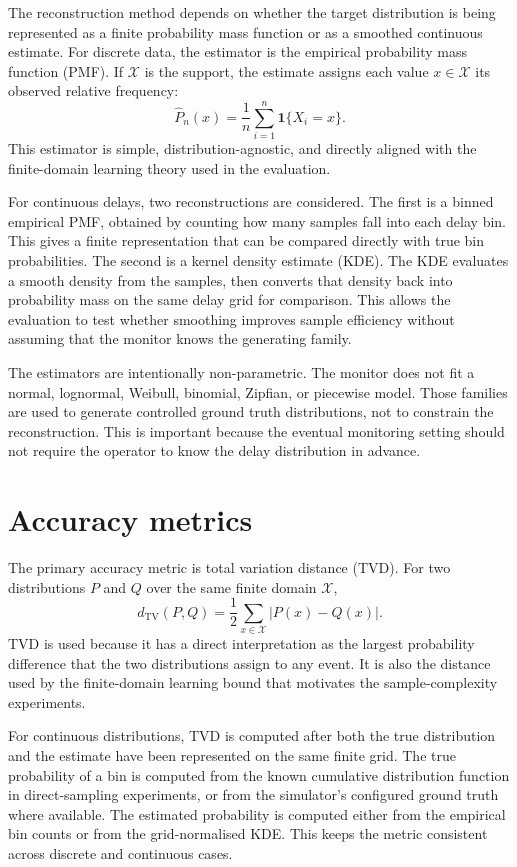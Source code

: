\documentclass[a4paper,11pt]{report}
\begin{document}
The reconstruction method depends on whether the target distribution is being represented as a finite probability mass function or as a smoothed continuous estimate. For discrete data, the estimator is the empirical probability mass function (PMF). If \(\mathcal{X}\) is the support, the estimate assigns each value \(x \in \mathcal{X}\) its observed relative frequency:
\[
\widehat{P}_n(x)=\frac{1}{n}\sum_{i=1}^{n}\mathbf{1}\{X_i=x\}.
\]
This estimator is simple, distribution-agnostic, and directly aligned with the finite-domain learning theory used in the evaluation.

For continuous delays, two reconstructions are considered. The first is a binned empirical PMF, obtained by counting how many samples fall into each delay bin. This gives a finite representation that can be compared directly with true bin probabilities. The second is a kernel density estimate (KDE). The KDE evaluates a smooth density from the samples, then converts that density back into probability mass on the same delay grid for comparison. This allows the evaluation to test whether smoothing improves sample efficiency without assuming that the monitor knows the generating family.

The estimators are intentionally non-parametric. The monitor does not fit a normal, lognormal, Weibull, binomial, Zipfian, or piecewise model. Those families are used to generate controlled ground truth distributions, not to constrain the reconstruction. This is important because the eventual monitoring setting should not require the operator to know the delay distribution in advance.

\section{Accuracy metrics}
\label{sec:method-accuracy-metrics}

The primary accuracy metric is total variation distance (TVD). For two distributions \(P\) and \(Q\) over the same finite domain \(\mathcal{X}\),
\[
d_{\mathrm{TV}}(P,Q)=\frac{1}{2}\sum_{x\in\mathcal{X}}|P(x)-Q(x)|.
\]
TVD is used because it has a direct interpretation as the largest probability difference that the two distributions assign to any event. It is also the distance used by the finite-domain learning bound that motivates the sample-complexity experiments.

For continuous distributions, TVD is computed after both the true distribution and the estimate have been represented on the same finite grid. The true probability of a bin is computed from the known cumulative distribution function in direct-sampling experiments, or from the simulator's configured ground truth where available. The estimated probability is computed either from the empirical bin counts or from the grid-normalised KDE. This keeps the metric consistent across discrete and continuous cases.
\end{document}
